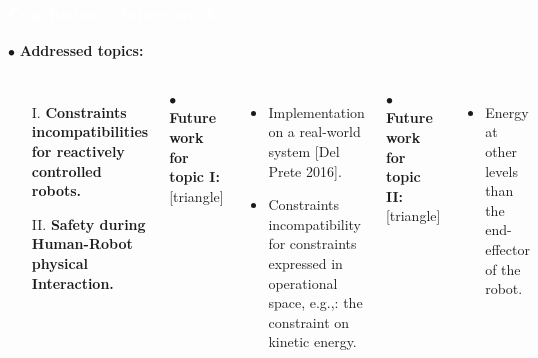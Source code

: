 \begin{frame}[noframenumbering]
\frametitle{{\textcolor{white}{\hspace{0.3cm}Conclusion -- future work}}}
\hspace{-6mm}
$\bullet$ {\color{blue-violet}\textbf{Addressed topics:}}
\begin{columns}
\column{\paperwidth-10mm}
\begin{itemize}
\item[I.]  {\color{red}\textbf{Constraints incompatibilities for reactively controlled robots.}}
\item[II.] {\color{red}\textbf{Safety during Human-Robot physical Interaction.}}
\end{itemize}
\vspace{3mm}
$\bullet$ {\color{ao(english)}\textbf{Future work for topic I:}}
[triangle] 
\begin{itemize}
\item Implementation on a real-world system [Del Prete 2016].
\item Constraints incompatibility for constraints expressed in operational space, e.g.,: the constraint on kinetic energy.
\end{itemize}
\vspace{5mm}
$\bullet$ {\color{ao(english)}\textbf{Future work for topic II:}}
[triangle] 
\begin{itemize}
\item Energy at other levels than the end-effector of the robot.
\end{itemize}
\end{columns}
\end{frame}









